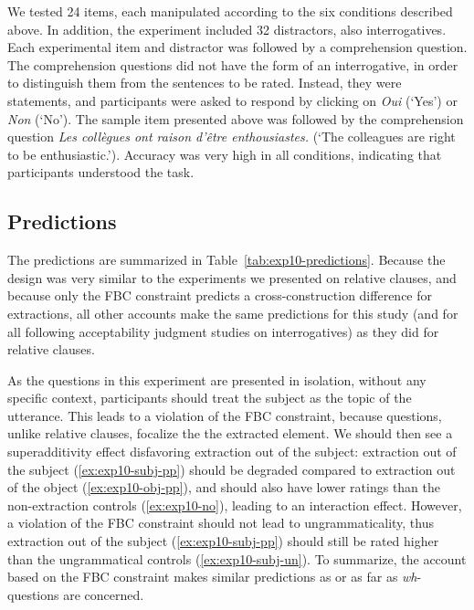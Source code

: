 We tested 24 items, each manipulated according to the six conditions described above. In addition, the experiment included 32 distractors, also interrogatives. Each experimental item and distractor was followed by a comprehension question. The comprehension questions did not have the form of an interrogative, in order to distinguish them from the sentences to be rated. Instead, they were statements, and participants were asked to respond by clicking on \emph{Oui} (`Yes') or \emph{Non} (`No'). The sample item presented above was followed by the comprehension question \emph{Les collègues ont raison d'être enthousiastes.} (`The colleagues are right to be enthusiastic.'). Accuracy was very high in all conditions, indicating that participants understood the task.

\subsection{Predictions}

The predictions are summarized in Table~\ref{tab:exp10-predictions}. Because the design was very similar to the experiments we presented on relative clauses, and because only the FBC constraint predicts a cross-construction difference for extractions, all other accounts make the same predictions for this study (and for all following acceptability judgment studies on interrogatives) as they did for relative clauses.

As the questions in this experiment are presented in isolation, without any specific context, participants should treat the subject as the topic of the utterance. This leads to a violation of the FBC constraint, because questions, unlike relative clauses, focalize the the extracted element. We should then see a superadditivity effect 
disfavoring extraction out of the subject: extraction out of the subject (\ref{ex:exp10-subj-pp}) should be degraded compared to extraction out of the object (\ref{ex:exp10-obj-pp}), and should also have lower ratings than the non-extraction controls (\ref{ex:exp10-no}), leading to an interaction effect. However, a violation of the FBC constraint should not lead to ungrammaticality, thus extraction out of the subject (\ref{ex:exp10-subj-pp}) should still be rated higher than the ungrammatical controls (\ref{ex:exp10-subj-un}). To summarize, the account based on the FBC constraint makes similar predictions as \citet{Kluender.2004} or \citet{Goldberg.2006} as far as \emph{wh}-questions are concerned. 



